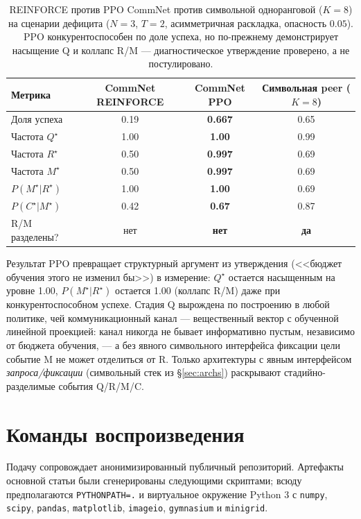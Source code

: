 \documentclass{article}
\begin{document}
\begin{table}[h]
\centering
\small
\caption{REINFORCE против PPO CommNet против символьной одноранговой ($K{=}8$) на сценарии дефицита ($N{=}3$, $T{=}2$, асимметричная раскладка, опасность $0.05$). PPO конкурентоспособен по доле успеха, но по-прежнему демонстрирует насыщение Q и коллапс R/M --- диагностическое утверждение проверено, а не постулировано.}
\label{tab:ppo-commnet}
\begin{tabular}{l c c c}
\toprule
Метрика & CommNet REINFORCE & \textbf{CommNet PPO} & Символьная peer ($K{=}8$) \\
\midrule
Доля успеха                   & 0.19   & \textbf{0.667} & 0.65 \\
Частота $Q^\star$             & 1.00   & \textbf{1.00}  & 0.99 \\
Частота $R^\star$             & 0.50   & \textbf{0.997} & 0.69 \\
Частота $M^\star$             & 0.50   & \textbf{0.997} & 0.69 \\
$P(M^\star|R^\star)$          & 1.00   & \textbf{1.00}  & 0.69 \\
$P(C^\star|M^\star)$          & 0.42   & \textbf{0.67}  & 0.87 \\
R/M разделены?                & нет    & \textbf{нет}   & \textbf{да} \\
\bottomrule
\end{tabular}
\end{table}

Результат PPO превращает структурный аргумент из утверждения (<<бюджет обучения этого не изменил бы>>) в измерение: $Q^\star$ остается насыщенным на уровне 1.00, $P(M^\star|R^\star)$ остается 1.00 (коллапс R/M) даже при конкурентоспособном успехе. Стадия Q вырождена по построению в любой политике, чей коммуникационный канал --- вещественный вектор с обученной линейной проекцией: канал никогда не бывает информативно пустым, независимо от бюджета обучения, --- а без явного символьного интерфейса фиксации цели событие M не может отделиться от R. Только архитектуры с явным интерфейсом \emph{запроса/фиксации} (символьный стек из \S\ref{sec:archs}) раскрывают стадийно-разделимые события Q/R/M/C.

\section{Команды воспроизведения}
\label{app:repro}

Подачу сопровождает анонимизированный публичный репозиторий. Артефакты основной статьи были сгенерированы следующими скриптами; всюду предполагаются \texttt{PYTHONPATH=.} и виртуальное окружение Python 3 с \texttt{numpy}, \texttt{scipy}, \texttt{pandas}, \texttt{matplotlib}, \texttt{imageio}, \texttt{gymnasium} и \texttt{minigrid}.
\end{document}
